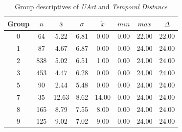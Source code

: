 \begin{table}[ht]
	\small
	\centering
	\begin{tabular}{c|c|c|c|c|c|c|c}
		\hline
		Group & $n$ & $\bar{x}$ & $\sigma$ & $\tilde{x}$ & $min$ & $max$ & $\Delta$ \\
		\hline
		0 & 64 & 5.22 & 6.81 & 0.00 & 0.00 & 22.00 & 22.00 \\ 
		1 & 87 & 4.67 & 6.87 & 0.00 & 0.00 & 24.00 & 24.00 \\ 
		2 & 838 & 5.02 & 6.51 & 1.00 & 0.00 & 24.00 & 24.00 \\ 
		3 & 453 & 4.47 & 6.28 & 0.00 & 0.00 & 24.00 & 24.00 \\ 
		5 & 90 & 2.44 & 5.48 & 0.00 & 0.00 & 24.00 & 24.00 \\ 
		7 & 35 & 12.63 & 8.62 & 14.00 & 0.00 & 24.00 & 24.00 \\ 
		8 & 165 & 8.79 & 7.55 & 8.00 & 0.00 & 24.00 & 24.00 \\ 
		9 & 125 & 9.02 & 7.02 & 9.00 & 0.00 & 24.00 & 24.00 \\ 
		\hline
	\end{tabular}
	\caption{Group descriptives of \textit{UArt} and \textit{Temporal Distance}}
	\label{tbl:descriptives_baysis_matched_UArt_TDist}
\end{table}

